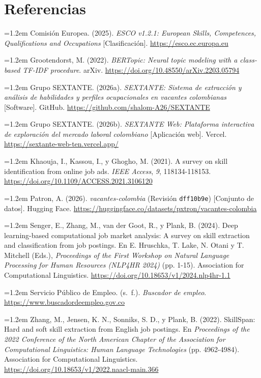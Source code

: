 \documentclass[journal]{IEEEtran}
\newcommand{\apa}[1]{\par\noindent\hangindent=1.2em\hangafter=1 #1\par\vspace{2pt}}
\begin{document}
\section*{Referencias}
\footnotesize\raggedright
\apa{Comisión Europea. (2025). \textit{ESCO v1.2.1: European Skills, Competences, Qualifications and Occupations} [Clasificación]. \url{https://esco.ec.europa.eu}}
\apa{Grootendorst, M. (2022). \textit{BERTopic: Neural topic modeling with a class-based TF-IDF procedure}. arXiv. \url{https://doi.org/10.48550/arXiv.2203.05794}}
\apa{Grupo SEXTANTE. (2026a). \textit{SEXTANTE: Sistema de extracción y análisis de habilidades y perfiles ocupacionales en vacantes colombianas} [Software]. GitHub. \url{https://github.com/shalom-A26/SEXTANTE}}
\apa{Grupo SEXTANTE. (2026b). \textit{SEXTANTE Web: Plataforma interactiva de exploración del mercado laboral colombiano} [Aplicación web]. Vercel. \url{https://sextante-web-ten.vercel.app/}}
\apa{Khaouja, I., Kassou, I., y Ghogho, M. (2021). A survey on skill identification from online job ads. \textit{IEEE Access}, \textit{9}, 118134-118153. \url{https://doi.org/10.1109/ACCESS.2021.3106120}}
\apa{Patron, A. (2026). \textit{vacantes-colombia} (Revisión \texttt{dff10b9e}) [Conjunto de datos]. Hugging Face. \url{https://huggingface.co/datasets/pxtron/vacantes-colombia}}
\apa{Senger, E., Zhang, M., van der Goot, R., y Plank, B. (2024). Deep learning-based computational job market analysis: A survey on skill extraction and classification from job postings. En E. Hruschka, T. Lake, N. Otani y T. Mitchell (Eds.), \textit{Proceedings of the First Workshop on Natural Language Processing for Human Resources (NLP4HR 2024)} (pp. 1-15). Association for Computational Linguistics. \url{https://doi.org/10.18653/v1/2024.nlp4hr-1.1}}
\apa{Servicio Público de Empleo. (s.~f.). \textit{Buscador de empleo}. \url{https://www.buscadordeempleo.gov.co}}
\apa{Zhang, M., Jensen, K. N., Sonniks, S. D., y Plank, B. (2022). SkillSpan: Hard and soft skill extraction from English job postings. En \textit{Proceedings of the 2022 Conference of the North American Chapter of the Association for Computational Linguistics: Human Language Technologies} (pp. 4962-4984). Association for Computational Linguistics. \url{https://doi.org/10.18653/v1/2022.naacl-main.366}}
\end{document}
